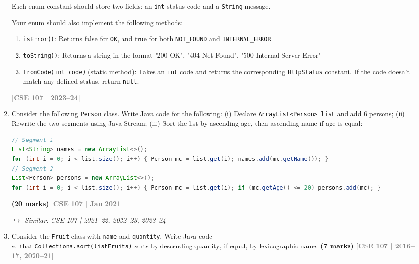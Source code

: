 \documentclass[12pt,a3paper]{article}
\newcommand{\yr}[1]{\hfill\textcolor{gray}{\small\textbf{[#1]}}}
\newcommand{\mk}[1]{\textcolor{orange!70!black}{\small\textbf{(#1 marks)}}}
\newcommand{\variant}[1]{\par\vspace{1pt}\textcolor{blue!50!black}%
  {\footnotesize\textit{$\hookrightarrow$ Similar: #1}}}
\begin{document}
\begin{enumerate}
Each enum constant should store two fields: an \texttt{int} status code and a \texttt{String} message.

Your enum should also implement the following methods:
\begin{enumerate}
    \item \texttt{isError()}: Returns false for \texttt{OK}, and true for both \texttt{NOT\_FOUND} and \texttt{INTERNAL\_ERROR}
    \item \texttt{toString()}: Returns a string in the format "200 OK", "404 Not Found", "500 Internal Server Error"
    \item \texttt{fromCode(int code)} (static method): Takes an \texttt{int} code and returns the corresponding \texttt{HttpStatus} constant. If the code doesn't match any defined status, return \texttt{null}.
\end{enumerate}
\yr{CSE 107 | 2023--24}





\item Consider the following \texttt{Person} class. Write Java code for the following: (i) Declare \texttt{ArrayList<Person> list} and add 6 persons; (ii) Rewrite the two segments using Java Stream; (iii) Sort the list by ascending age, then ascending name if age is equal:
\begin{lstlisting}[language=Java]
// Segment 1
List<String> names = new ArrayList<>();
for (int i = 0; i < list.size(); i++) { Person mc = list.get(i); names.add(mc.getName()); }
// Segment 2
List<Person> persons = new ArrayList<>();
for (int i = 0; i < list.size(); i++) { Person mc = list.get(i); if (mc.getAge() <= 20) persons.add(mc); }
\end{lstlisting}
\mk{20}
\yr{CSE 107 | Jan 2021}
\variant{CSE 107 | 2021--22, 2022--23, 2023--24}





\item Consider the \texttt{Fruit} class with \texttt{name} and \texttt{quantity}. Write Java code \\so that \texttt{Collections.sort(listFruits)} sorts by descending quantity; if equal, by lexicographic name. \mk{7}
\yr{CSE 107 | 2016--17, 2020--21}





\end{enumerate}
\end{document}
